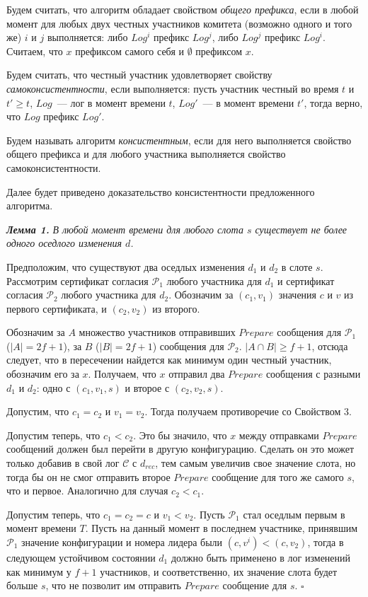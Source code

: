 Будем считать, что алгоритм обладает свойством \textit{общего префикса}, если в любой момент для любых двух честных участников комитета (возможно одного и того же) $i$ и $j$ выполняется: либо $Log^i$ префикс $Log^j$, либо $Log^j$ префикс $Log^i$. Считаем, что $x$ префиксом самого себя и $\emptyset$ префиксом $x$.

Будем считать, что честный участник удовлетворяет свойству \textit{самоконсистентности}, если выполняется: пусть участник честный во время $t$ и $t' \ge t$, $Log$~--- лог в момент времени $t$, $Log'$~--- в момент времени $t'$, тогда верно, что $Log$ префикс $Log'$.

Будем называть алгоритм \textit{консистентным}, если для него выполняется свойство общего префикса и для любого участника выполняется свойство самоконсистентности.
 
Далее будет приведено доказательство консистентности предложенного алгоритма.

\textbf{\textit{Лемма 1.}} \textit{В любой момент времени для любого слота $s$ существует не более одного оседлого изменения $d$.}

Предположим, что существуют два оседлых изменения $d_1$ и $d_2$ в слоте $s$. Рассмотрим сертификат согласия $\mathcal{P}_1$ любого участника для $d_1$ и сертификат согласия $\mathcal{P}_2$ любого участника для $d_2$. Обозначим за $(c_1, v_1)$ значения $c$ и $v$ из первого сертификата, и $(c_2, v_2)$ из второго.

Обозначим за $A$ множество участников отправивших $Prepare$ сообщения для  $\mathcal{P}_1$ ($|A|=2f+1$), за $B$ ($|B|=2f+1$) сообщения для $\mathcal{P}_2$. $|A \cap B| \ge f+1$, отсюда следует, что в пересечении найдется как минимум один честный участник,  обозначим его за $x$. Получаем, что $x$ отправил два $Prepare$ сообщения с разными $d_1$ и $d_2$: одно с $(c_1, v_1, s)$ и второе с $(c_2, v_2, s)$.

Допустим, что $c_1 = c_2$ и $v_1 = v_2$. Тогда получаем противоречие со Свойством 3.

Допустим теперь, что $c_1 < c_2$. Это бы значило, что $x$ между отправками $Prepare$ сообщений должен был перейти в другую конфигурацию. Сделать он это может только добавив в свой лог $\mathcal{C}$ с $d_{rec}$, тем самым увеличив свое значение слота, но тогда бы он не смог отправить второе $Prepare$ сообщение для того же самого $s$, что и первое. Аналогично для случая $c_2 < c_1$.

Допустим теперь, что $c_1=c_2=c$ и $v_1 < v_2$. Пусть $\mathcal{P}_1$ стал оседлым первым в момент времени $T$. Пусть на данный момент в последнем участнике, принявшим $\mathcal{P}_1$ значение конфигурации и номера лидера были $(c, v^i) < (c, v_2)$, тогда в следующем устойчивом состоянии $d_1$ должно быть применено в лог изменений как минимум у $f+1$ участников, и соответственно, их значение слота будет больше $s$, что не позволит им отправить $Prepare$ сообщение для $s$. $\square$
\vspace{10pt}

